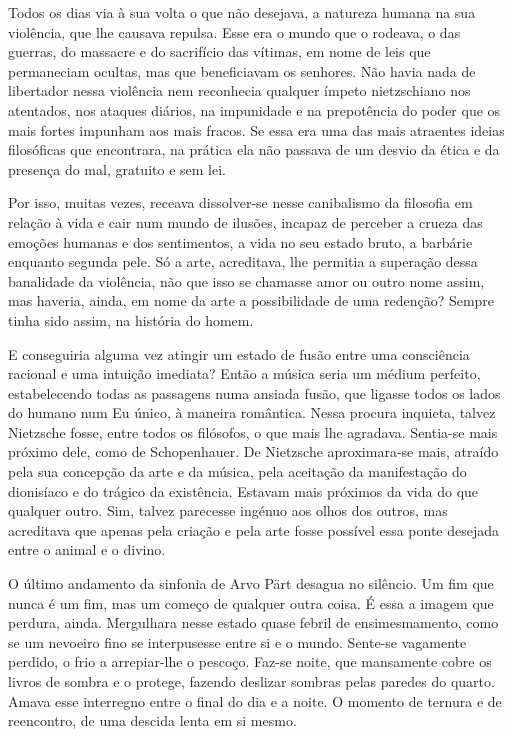 Todos os dias via à sua volta o que não desejava, a natureza humana na
sua violência, que lhe causava repulsa. Esse era o mundo que o rodeava,
o das guerras, do massacre e do sacrifício das vítimas, em nome de leis
que permaneciam ocultas, mas que beneficiavam os senhores. Não havia
nada de libertador nessa violência nem reconhecia qualquer ímpeto
nietzschiano nos atentados, nos ataques diários, na impunidade e na
prepotência do poder que os mais fortes impunham aos mais fracos. Se
essa era uma das mais atraentes ideias filosóficas que encontrara, na
prática ela não passava de um desvio da ética e da presença do mal,
gratuito e sem lei.

Por isso, muitas vezes, receava dissolver-se nesse canibalismo da
filosofia em relação à vida e cair num mundo de ilusões, incapaz de
perceber a crueza das emoções humanas e dos sentimentos, a vida no seu
estado bruto, a barbárie enquanto segunda pele. Só a arte, acreditava,
lhe permitia a superação dessa banalidade da violência, não que isso se
chamasse amor ou outro nome assim, mas haveria, ainda, em nome da arte a
possibilidade de uma redenção? Sempre tinha sido assim, na história do
homem.

E conseguiria alguma vez atingir um estado de fusão entre uma
consciência racional e uma intuição imediata? Então a música seria um
médium perfeito, estabelecendo todas as passagens numa ansiada fusão,
que ligasse todos os lados do humano num Eu único, à maneira romântica.
Nessa procura inquieta, talvez Nietzsche fosse, entre todos os
filósofos, o que mais lhe agradava. Sentia-se mais próximo dele, como de
Schopenhauer. De Nietzsche aproximara-se mais, atraído pela sua
concepção da arte e da música, pela aceitação da manifestação do
dionisíaco e do trágico da existência. Estavam mais próximos da vida do
que qualquer outro. Sim, talvez parecesse ingénuo aos olhos dos outros,
mas acreditava que apenas pela criação e pela arte fosse possível essa
ponte desejada entre o animal e o divino.

O último andamento da sinfonia de Arvo Pärt desagua no silêncio. Um fim
que nunca é um fim, mas um começo de qualquer outra coisa. É essa a
imagem que perdura, ainda. Mergulhara nesse estado quase febril de
ensimesmamento, como se um nevoeiro fino se interpusesse entre si e o
mundo. Sente-se vagamente perdido, o frio a arrepiar-lhe o pescoço.
Faz-se noite, que mansamente cobre os livros de sombra e o protege,
fazendo deslizar sombras pelas paredes do quarto. Amava esse interregno
entre o final do dia e a noite. O momento de ternura e de reencontro, de
uma descida lenta em si mesmo.


